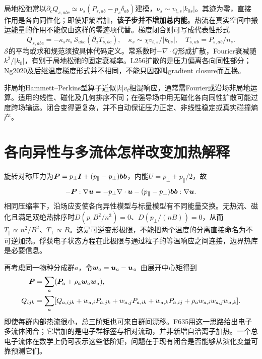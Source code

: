 局地松弛常以$\partial_cQ_{s,abc}\simeq\nu_s(P_{s,ab}-p_s\delta_{ab})$建模，$\nu_s\sim v_{t,s}|k_{0s}|$。其迹为零，直接作用是各向同性化；即使矩熵增加，\textbf{该子步并不增加总内能}。热流在真实空间中搬运能量的作用不能仅由这样的零迹项代替。梯度闭合则可写成代表性形式
\begin{equation}
Q_{s,abc}=-\kappa_s n_s\,\mathcal S_{abc}(\partial_aT_{s,bc}),
\quad \kappa_s\sim\chi v_{t,s}/|k_{0s}|,\quad T_{s,ab}=P_{s,ab}/n_s.
\end{equation}
$\mathcal S$的平均或求和规范须按具体代码定义。常系数时$-\nabla\cdot Q$形成扩散，Fourier衰减随$k^2/|k_0|$，有别于局地松弛的固定衰减率。L256扩散的是压力偏离各向同性部分；Ng2020及后继温度梯度形式并不相同，不能只因都叫gradient closure而互换。

非局地Hammett--Perkins型算子近似$|k|v_t$相混响应，通常需Fourier或沿场非局地运算。适用的线性、磁化及几何排序不同；在强导场中用无磁化各向同性扩散可能过度跨场输运。闭合变得更复杂，并不自动保证压力正定、非线性稳定或真实碰撞熵产。\citep{Wang2015,Ng2017,L256,Ng2020,Closure2026}

\section{各向异性与多流体怎样改变加热解释}
旋转对称压力为$\bm{P}=p_\perp\bm{I}+(p_\parallel-p_\perp)\bm{b}\bm{b}$，内能$U=p_\perp+p_\parallel/2$，故
\begin{equation}
-\bm{P}:\nabla\bm{u}=-p_\perp\nabla\cdot\bm{u}-(p_\parallel-p_\perp)\bm{b}\bm{b}:\nabla\bm{u}.
\end{equation}
相同压缩率下，沿场应变使各向异性模型与标量模型有不同能量交换。无热流、磁化且满足双绝热排序时$D(p_\parallel B^2/n^3)=0$、$D(p_\perp/(nB))=0$，从而$T_\parallel\propto n^2/B^2$、$T_\perp\propto B$。这是可逆变形极限，不能把两个温度的分离直接命名为不可逆加热。俘获电子状态方程在此极限与通过粒子的等温响应之间连接，边界热库是必要信息。\citep{Wetherton2019,Wetherton2021}

再考虑同一物种分成群$a$，令$\bm{w}_a=\bm{u}_a-\bm{u}$。由展开中心矩得到
\begin{align}
\bm{P}&=\sum_a(\bm{P}_a+\rho_a\bm{w}_a\bm{w}_a),\\
Q_{ijk}&=\sum_a[Q_{a,ijk}+w_{a,i}P_{a,jk}+w_{a,j}P_{a,ik}+w_{a,k}P_{a,ij}
+\rho_aw_{a,i}w_{a,j}w_{a,k}].
\end{align}
即使每群内部热流很小，总三阶矩也可来自群间漂移。F635用这一思路给出电子多流体闭合；它增加的是电子群标签与相对流动，并非新增自洽离子加热。一个总电子流体在数学上仍可表示这些低阶矩，问题在于现有闭合是否能够从演化变量可靠预测它们。\citep{F635}
